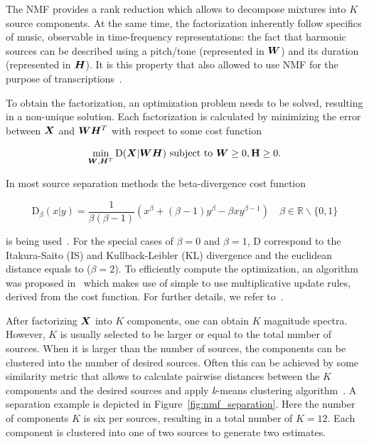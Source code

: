 The NMF provides a rank reduction which allows to decompose mixtures into \(K\) source components.
At the same time, the factorization inherently follow specifics of music, observable in time-frequency representations: the fact that harmonic sources can be described using a pitch/tone (represented in \({\bm{W}}\)) and its duration (represented in \({\bm{H}}\)).
It is this property that also allowed to use NMF for the purpose of transcriptions~\cite{smaragdis03}.
\par
To obtain the factorization, an optimization problem needs to be solved, resulting in a non-unique solution.
Each factorization is calculated by minimizing the error between \({\bm{X}}\) and \({\bm{W}} {\bm{H}}^{T}\) with respect to some cost function

\begin{equation}
  \min_{{\bm{W}},{\bm{H}}^{T}} \mathrm{D}({\bm{X}} | {\bm{W}} {\bm{H}}) \text { subject to } {\bm{W}} \geq 0 , \mathbf {{\bm{H}}} \geq 0.
\end{equation}

In most source separation methods the beta-divergence cost function

\begin{equation}
  \mathrm{D}_{\beta} (x | y) = \frac { 1 } { \beta ( \beta - 1 ) } \left( x ^ { \beta } + ( \beta - 1 ) y ^ { \beta } - \beta x y ^ { \beta - 1 } \right) \quad \beta \in \mathbb { R } \backslash \{ 0, 1 \}
\end{equation}

is being used~\cite{fitzgerald08a}. 
For the special cases of \(\beta = 0\) and \(\beta = 1\), \(\mathrm{D}\) correspond to the Itakura-Saito (IS) and Kullback-Leibler (KL) divergence and the euclidean distance equals to (\(\beta = 2\)).
To efficiently compute the optimization, an algorithm was proposed in~\cite{lee01} which makes use of simple to use multiplicative update rules, derived from the cost function.
For further details, we refer to~\cite{cichoki09}.
\par
After factorizing \({\bm{X}}\) into \(K\) components, one can obtain \(K\) magnitude spectra.
However, \(K\) is usually selected to be larger or equal to the total number of sources.
When it is larger than the number of sources, the components can be clustered into the number of desired sources.
Often this can be achieved by some similarity metric that allows to calculate pairwise distances between the \(K\) components and the desired sources and apply \textit{k}-means clustering algorithm~\cite{spiertz09}.
A separation example is depicted in Figure~\ref{fig:nmf_separation}. 
Here the number of components \(K\) is six per sources, resulting in a total number of \(K=12\). 
Each component is clustered into one of two sources to generate two estimates.

